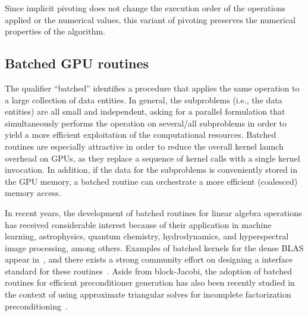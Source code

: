 Since implicit pivoting does not change the execution order of the 
operations applied or the numerical values,
this variant of pivoting preserves the numerical properties of the algorithm.

\subsection{Batched GPU routines} \label{sec:batched}

The qualifier ``batched'' identifies a procedure that applies the same operation to a large collection of data entities.
In general, the subproblems (i.e., the data entities) are all small and independent, 
asking for a parallel formulation that
simultaneously performs the operation on several/all subproblems in order to
yield a more efficient exploitation of the computational resources.
Batched routines are especially attractive 
{in order to reduce} 
the overall kernel launch overhead on GPUs, as they replace a sequence of kernel calls with a single kernel invocation.
In addition, if the data for the subproblems is conveniently stored in the GPU memory,
a batched routine can orchestrate a more efficient (coalesced) memory access.

In recent years, 
the development of batched routines for linear algebra
operations has received considerable interest
because of their {application in}
machine learning, astrophysics, quantum
chemistry, hydrodynamics, and hyperspectral image processing, among others.
Examples of batched 
kernels for the dense BLAS appear in~\cite{7275187,Haidar:2015:BMC:2766466.2766470},
and there exists a strong community effort on designing a interface standard for these routines~\cite{bblas}.
Aside from block-Jacobi, the {adoption} of batched routines for efficient
preconditioner generation has also
been recently studied in the context of using approximate triangular solves for
incomplete factorization preconditioning~\cite{scala2016,Anzt:2017:BGE:3026937.3026940}.

